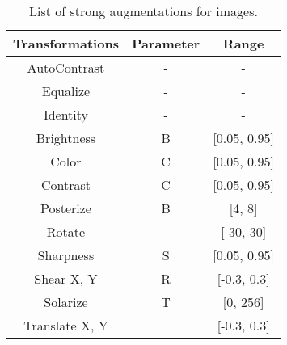 \begin{table}[h]
\centering
\caption{List of strong augmentations for images.}
\begin{tabular}{@{}ccc@{}}
\toprule
Transformations       & Parameter      & Range \\ \midrule
AutoContrast      & - & -  \\
Equalize     & - & -  \\
Identity        & - & -  \\
Brightness   & B      & [0.05, 0.95]  \\
Color & C      & [0.05, 0.95]  \\
Contrast & C      & [0.05, 0.95]  \\
Posterize & B      & [4, 8]  \\
Rotate &       & [-30, 30]  \\
Sharpness & S      & [0.05, 0.95]  \\
Shear X, Y & R      & [-0.3, 0.3]  \\
Solarize & T      & [0, 256] \\
Translate X, Y &            & [-0.3, 0.3]  \\ \bottomrule
\end{tabular}
\label{tab:strong_aug_image}
\end{table}

